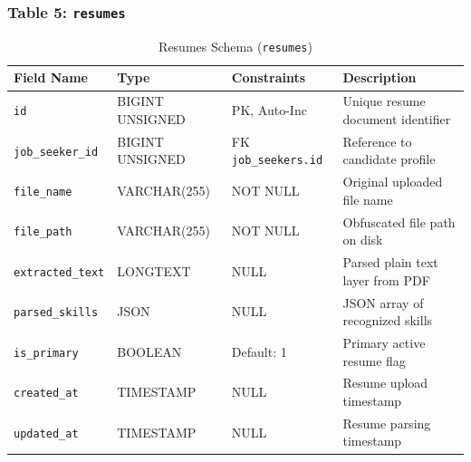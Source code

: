 \subsubsection{Table 5: \texttt{resumes}}
\begin{table}[H]
\centering
\small
\caption{Resumes Schema (\texttt{resumes})}
\label{tab:schema_resumes}
\begin{tabular}{|p{3cm}|p{2.8cm}|p{2.2cm}|p{5.5cm}|}
\hline
\textbf{Field Name} & \textbf{Type} & \textbf{Constraints} & \textbf{Description} \\ \hline
\texttt{id} & BIGINT UNSIGNED & PK, Auto-Inc & Unique resume document identifier \\ \hline
\texttt{job\_seeker\_id} & BIGINT UNSIGNED & FK \texttt{job\_seekers.id} & Reference to candidate profile \\ \hline
\texttt{file\_name} & VARCHAR(255) & NOT NULL & Original uploaded file name \\ \hline
\texttt{file\_path} & VARCHAR(255) & NOT NULL & Obfuscated file path on disk \\ \hline
\texttt{extracted\_text}& LONGTEXT & NULL & Parsed plain text layer from PDF \\ \hline
\texttt{parsed\_skills} & JSON & NULL & JSON array of recognized skills \\ \hline
\texttt{is\_primary} & BOOLEAN & Default: 1 & Primary active resume flag \\ \hline
\texttt{created\_at} & TIMESTAMP & NULL & Resume upload timestamp \\ \hline
\texttt{updated\_at} & TIMESTAMP & NULL & Resume parsing timestamp \\ \hline
\end{tabular}
\end{table}

